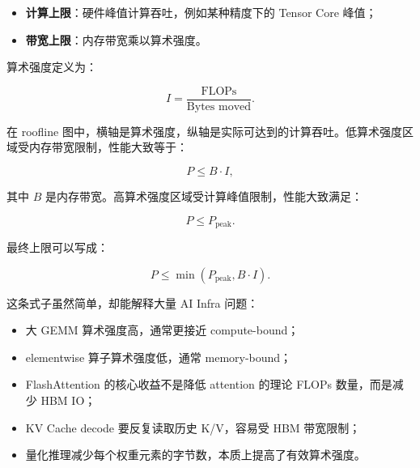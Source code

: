 \begin{itemize}
  \item \textbf{计算上限}：硬件峰值计算吞吐，例如某种精度下的 Tensor Core 峰值；
  \item \textbf{带宽上限}：内存带宽乘以算术强度。
\end{itemize}

算术强度定义为：

\[
  I = \frac{\text{FLOPs}}{\text{Bytes moved}}.
\]

在 roofline 图中，横轴是算术强度，纵轴是实际可达到的计算吞吐。低算术强度区域受内存带宽限制，性能大致等于：

\[
  P \leq B \cdot I,
\]

其中 $B$ 是内存带宽。高算术强度区域受计算峰值限制，性能大致满足：

\[
  P \leq P_{\text{peak}}.
\]

最终上限可以写成：

\[
  P \leq \min(P_{\text{peak}}, B \cdot I).
\]

这条式子虽然简单，却能解释大量 AI Infra 问题：

\begin{itemize}
  \item 大 GEMM 算术强度高，通常更接近 compute-bound；
  \item elementwise 算子算术强度低，通常 memory-bound；
  \item FlashAttention 的核心收益不是降低 attention 的理论 FLOPs 数量，而是减少 HBM IO；
  \item KV Cache decode 要反复读取历史 K/V，容易受 HBM 带宽限制；
  \item 量化推理减少每个权重元素的字节数，本质上提高了有效算术强度。
\end{itemize}

